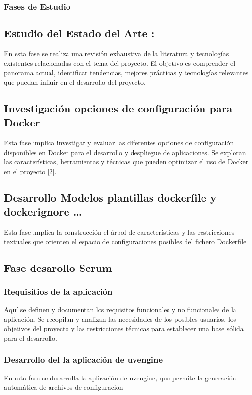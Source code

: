 \documentclass[12pt, a4paper, twoside]{article}
\begin{document}
\subsubsection{Fases de Estudio}
\subsection{Estudio del Estado del Arte :}
En esta fase se realiza una revisión exhaustiva de la literatura y tecnologías existentes relacionadas con el tema del 
proyecto. El objetivo es comprender el panorama actual, identificar tendencias, mejores prácticas y tecnologías 
relevantes que puedan influir en el desarrollo del proyecto.
\subsection{Investigación opciones de configuración para Docker}
Esta fase implica investigar y evaluar las diferentes opciones de configuración disponibles en Docker para el desarrollo 
y despliegue de aplicaciones. Se exploran las características, herramientas y técnicas que pueden optimizar el uso de 
Docker en el proyecto [2].

\subsection{Desarrollo Modelos plantillas dockerfile y dockerignore …}
Esta fase implica la construcción el árbol de características y las restricciones textuales que orienten el espacio de 
configuraciones posibles del fichero Dockerfile 

\subsection{Fase desarollo Scrum}
\subsubsection{Requisitios de la aplicación }
Aquí se definen y documentan los requisitos funcionales y no funcionales de la aplicación. Se recopilan y analizan las 
necesidades de los posibles usuarios, los objetivos del proyecto y las restricciones técnicas para establecer una base 
sólida para el desarrollo.
\subsubsection{Desarrollo del la aplicación de uvengine }
En esta fase se desarrolla la aplicación de uvengine, que permite la generación automática de archivos de configuración
\end{document}
